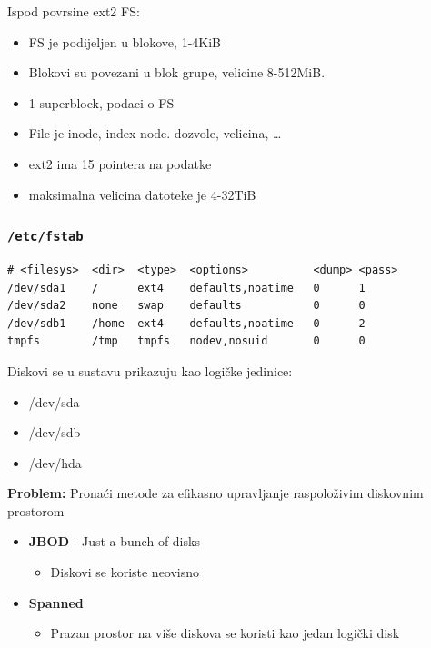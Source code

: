 \documentclass[t]{beamer}
\begin{document}
\begin{frame}
    Ispod povrsine ext2 FS:

    \begin{itemize}
        \item FS je podijeljen u blokove, 1-4KiB
        \item Blokovi su povezani u blok grupe, velicine 8-512MiB. 
        \item 1 superblock, podaci o FS
        \item File je inode, index node. dozvole, velicina, \ldots
        \item ext2 ima 15 pointera na podatke
        \item maksimalna velicina datoteke je 4-32TiB
    \end{itemize}
\end{frame}


\begin{frame}[fragile]
	\frametitle{\texttt{/etc/fstab}}
\begin{verbatim}
# <filesys>  <dir>  <type>  <options>          <dump> <pass>
/dev/sda1    /      ext4    defaults,noatime   0      1
/dev/sda2    none   swap    defaults           0      0
/dev/sdb1    /home  ext4    defaults,noatime   0      2
tmpfs        /tmp   tmpfs   nodev,nosuid       0      0
\end{verbatim}
\end{frame}

\begin{frame}
	Diskovi se u sustavu prikazuju kao logičke jedinice:
	{\ttfamily
		\begin{itemize}
			\item[] /dev/sda
			\item[] /dev/sdb
			\item[] /dev/hda
		\end{itemize}
	}
	\textbf{Problem:} Pronaći metode za efikasno upravljanje raspoloživim diskovnim prostorom
	\vfill
	\begin{itemize}
		\item \textbf{JBOD} - Just a bunch of disks
		\begin{itemize}
			\item Diskovi se koriste neovisno
		\end{itemize}
		\item \textbf{Spanned}
		\begin{itemize}
			\item Prazan prostor na više diskova se koristi kao jedan logički disk
		\end{itemize}
	\end{itemize}
\end{frame}
\end{document}
